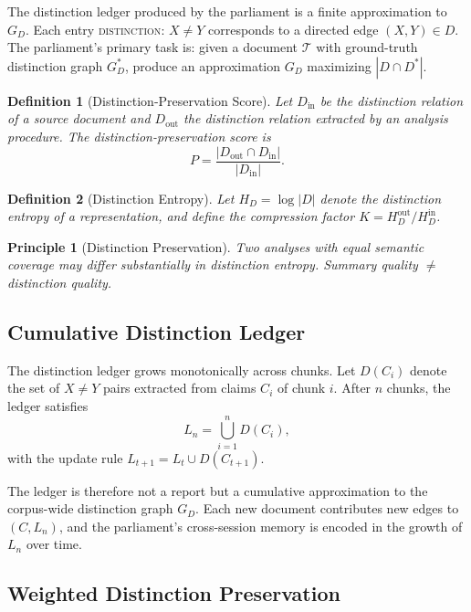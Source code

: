 \documentclass[12pt, a4paper]{article}
\newtheorem{definition}{Definition}[section]
\theoremstyle{principle}
\newtheorem{principle}{Principle}[section]
\theoremstyle{definition}
\begin{document}
The distinction ledger produced by the parliament is a finite approximation to
$G_D$. Each entry \textsc{distinction}: $X \neq Y$ corresponds to a directed edge
$(X, Y) \in D$. The parliament's primary task is: given a document $\mathcal{T}$
with ground-truth distinction graph $G_D^*$, produce an approximation $G_D$
maximizing $|D \cap D^*|$.

\begin{definition}[Distinction-Preservation Score]
Let $D_\mathrm{in}$ be the distinction relation of a source document and
$D_\mathrm{out}$ the distinction relation extracted by an analysis procedure. The
\emph{distinction-preservation score} is
\[
P = \frac{|D_\mathrm{out} \cap D_\mathrm{in}|}{|D_\mathrm{in}|}.
\]
\end{definition}

\begin{definition}[Distinction Entropy]
Let $H_D = \log |D|$ denote the \emph{distinction entropy} of a representation, and
define the \emph{compression factor} $K = H_D^\mathrm{out} / H_D^\mathrm{in}$.
\end{definition}

\begin{principle}[Distinction Preservation]
Two analyses with equal semantic coverage may differ substantially in distinction
entropy. Summary quality $\neq$ distinction quality.
\end{principle}

\subsection{Cumulative Distinction Ledger}

The distinction ledger grows monotonically across chunks. Let $D(C_i)$ denote the
set of $X \neq Y$ pairs extracted from claims $C_i$ of chunk $i$. After $n$ chunks,
the ledger satisfies
\[
L_n = \bigcup_{i=1}^{n} D(C_i),
\]
with the update rule $L_{t+1} = L_t \cup D(C_{t+1})$.

The ledger is therefore not a report but a cumulative approximation to the
corpus-wide distinction graph $G_D$. Each new document contributes new edges to
$(C, L_n)$, and the parliament's cross-session memory is encoded in the growth
of $L_n$ over time.

\subsection{Weighted Distinction Preservation}
\end{document}
